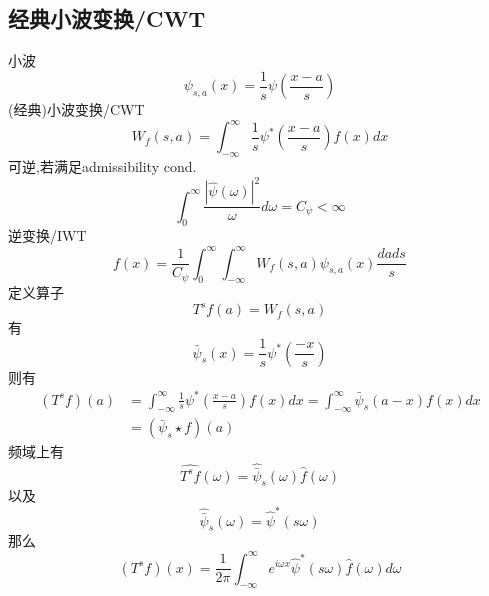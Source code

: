 \documentclass{article}
\begin{document}
\subsection{经典小波变换/CWT}
    小波
    \begin{equation}
        \psi_{s, a}(x)=\frac{1}{s} \psi\left(\frac{x-a}{s}\right)
    \end{equation}
    (经典)小波变换/CWT
    \begin{equation}
        W_{f}(s, a)=\int_{-\infty}^{\infty} \frac{1}{s} \psi^{*}\left(\frac{x-a}{s}\right) f(x) d x
    \end{equation}
    可逆,若满足admissibility cond.
    \begin{equation}
        \int_{0}^{\infty} \frac{|\hat{\psi}(\omega)|^{2}}{\omega} d \omega=C_{\psi}<\infty
    \end{equation}
    逆变换/IWT
    \begin{equation}
        f(x)=\frac{1}{C_{\psi}} \int_{0}^{\infty} \int_{-\infty}^{\infty} W_{f}(s, a) \psi_{s, a}(x) \frac{d a d s}{s}
    \end{equation}
    定义算子
    \begin{equation}
        T^{s} f(a)=W_{f}(s, a)
    \end{equation}
    有
    \begin{equation}
        \bar{\psi}_{s}(x)=\frac{1}{s} \psi^{*}\left(\frac{-x}{s}\right)
    \end{equation}
    则有
    \begin{equation}
        \begin{aligned}
        \left(T^{s} f\right)(a) &=\int_{-\infty}^{\infty} \frac{1}{s} \psi^{*}\left(\frac{x-a}{s}\right) f(x) d x=\int_{-\infty}^{\infty} \bar{\psi}_{s}(a-x) f(x) d x \\
        &=\left(\bar{\psi}_{s} \star f\right)(a)
        \end{aligned}
    \end{equation}
    频域上有
    \begin{equation}
        \widehat{T^{s} f}(\omega)=\hat{\bar{\psi}}_{s}(\omega) \hat{f}(\omega)
    \end{equation}
    以及
    \begin{equation}
        \hat{\bar{\psi}}_{s}(\omega)=\hat{\psi}^{*}(s \omega)
    \end{equation}
    那么
    \begin{equation}
        \left(T^{s} f\right)(x)=\frac{1}{2 \pi} \int_{-\infty}^{\infty} e^{i \omega x} \hat{\psi}^{*}(s \omega) \hat{f}(\omega) d \omega
    \end{equation}
\end{document}
